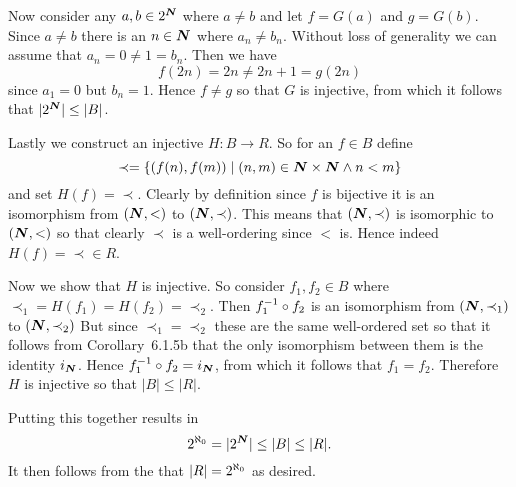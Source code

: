 {{    Now consider any $a, b \in 2^{\boldsymbol{N}}$ where $a \neq b$ and let $f = G(a)$ and $g = G(b)$.
    Since $a \neq b $ there is an $n \in {\boldsymbol{N}}$ where $a_n \neq b_n$.
    Without loss of generality we can assume that $a_n = 0 \neq 1 = b_n$.
    Then we have
    $$
      f(2n) = 2n \neq 2n+1 = g(2n)
    $$
    since $a_1 = 0$ but $b_n = 1$.
    Hence $f \neq g$ so that $G$ is injective, from which it follows that $|2^{\boldsymbol{N}}| \leq |B|$.

    Lastly we construct an injective $H : B \to R$.
    So for an $f \in B$ define
    $$
      \prec = \left\{ (f(n), f(m)) \mid (n,m) \in {\boldsymbol{N}} \times {\boldsymbol{N}} \land n < m \right\}
    $$
    and set $H(f) = \prec$.
    Clearly by definition since $f$ is bijective it is an isomorphism from $({\boldsymbol{N}}, <)$ to $({\boldsymbol{N}}, \prec)$.
    This means that $({\boldsymbol{N}}, \prec)$ is isomorphic to $({\boldsymbol{N}}, <)$ so that clearly $\prec$ is a well-ordering since $<$ is.
    Hence indeed $H(f) = \prec \in R$.

    Now we show that $H$ is injective.
    So consider $f_1, f_2 \in B$ where $\prec_1 = H(f_1) = H(f_2) = \prec_2$.
    Then $f_1^{-1} \circ f_2$ is an isomorphism from $({\boldsymbol{N}}, \prec_1)$ to $({\boldsymbol{N}}, \prec_2)$
    But since $\prec_1 = \prec_2$ these are the same well-ordered set so that it follows from Corollary~6.1.5b that the only isomorphism between them is the identity $i_{\boldsymbol{N}}$.
    Hence $f_1^{-1} \circ f_2 = i_{\boldsymbol{N}}$, from which it follows that $f_1 = f_2$.
    Therefore $H$ is injective so that $|B| \leq |R|$.

    Putting this together results in
    $$
      {2^{\aleph_0}} = |2^{\boldsymbol{N}}| \leq |B| \leq |R|.
    $$
    It then follows from the \cbthrm{} that $|R| = {2^{\aleph_0}}$ as desired.
  }
}

